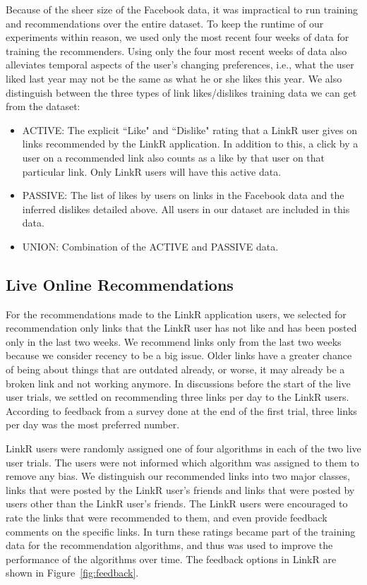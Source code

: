 Because of the sheer size of the Facebook data, it was impractical to run training and recommendations over the entire dataset. To keep the runtime of our experiments within reason, we used only the most recent four weeks of data for training the recommenders. Using only the four most recent weeks of data also alleviates temporal aspects of the user's changing preferences, i.e., what the user liked last year may not be the same as what he or she likes this year. We also distinguish between the three types of link likes/dislikes training data we can get from the dataset:

\begin{itemize}
\item {ACTIVE: The explicit ``Like" and ``Dislike" rating that a LinkR user gives on links recommended by the LinkR application. In addition to this, a click by a user on a recommended link also counts as a like by that user on that particular link. Only LinkR users will have this active data.}
\item {PASSIVE: The list of likes by users on links in the Facebook data and the inferred dislikes detailed above. All users in our dataset are included in this data.}
\item{UNION: Combination of the ACTIVE and PASSIVE data.}
\end{itemize}

\subsection{Live Online Recommendations}

For the recommendations made to the LinkR application users,  we selected for recommendation only links that the LinkR user has not like and has been posted only in the last two weeks. We recommend links only from the last two weeks because we consider recency to be a big issue. Older links have a greater chance of being about things that are outdated already, or worse, it may already be a broken link and not working anymore. In discussions before the start of the live user trials, we settled on recommending three links per day to the LinkR users. According to feedback from a survey done at the end of the first trial, three links per day was the most preferred number.

LinkR users were randomly assigned one of four algorithms in each of the two live user trials. The users were not informed which algorithm was assigned to them to remove any bias. We distinguish our recommended links into two major classes, links that were posted by the LinkR user's friends and links that were posted by users other than the LinkR user's friends. The LinkR users were encouraged to rate the links that were recommended to them, and even provide feedback comments on the specific links. In turn these ratings became part of the training data for the recommendation algorithms, and thus was used to improve the performance of the algorithms over time. The feedback options in LinkR are shown in Figure~\ref{fig:feedback}.

